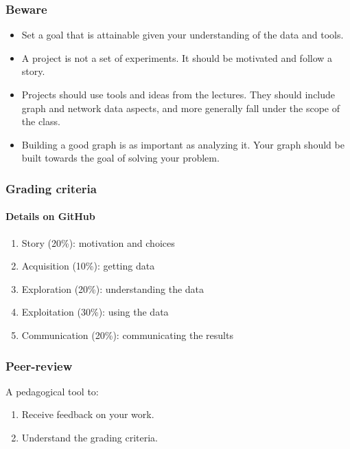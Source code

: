 \documentclass[aspectratio=169]{beamer}
\begin{document}

\begin{frame}
	\frametitle{Beware}
	\begin{itemize}
		\item Set a goal that is attainable given your understanding of the data and tools.
		\vfill
		\item A project is not a set of experiments. It should be motivated and follow a story.
		\vfill
		\item Projects should use tools and ideas from the lectures. They should include graph and network data aspects, and more generally fall under the scope of the class.
		\vfill
		\item Building a good graph is as important as analyzing it. Your graph should be built towards the goal of solving your problem. %
	\end{itemize}
\end{frame}


\begin{frame}
	\frametitle{Grading criteria}
	\framesubtitle{Details on GitHub}
	\begin{enumerate}
		\item Story (20\%): motivation and choices
		\vfill
		\item Acquisition (10\%): getting data
		\vfill
		\item Exploration (20\%): understanding the data
		\vfill
		\item Exploitation (30\%): using the data
		\vfill
		\item Communication (20\%): communicating the results
	\end{enumerate}
\end{frame}


\begin{frame}
	\frametitle{Peer-review}
	A pedagogical tool to:
	\vfill
	\begin{enumerate}
		\item Receive feedback on your work.
		\vfill
		\item Understand the grading criteria. %
	\end{enumerate}
	\vfill
\end{frame}

\end{document}
